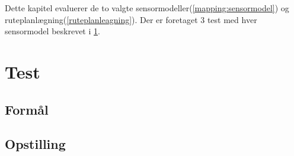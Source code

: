 Dette kapitel evaluerer de to valgte sensormodeller(\cref{mapping:sensormodel}) og ruteplanlægning(\cref{ruteplanleagning}).
Der er foretaget 3 test med hver sensormodel beskrevet i \cref{evaluering:test_beskrivelse}.

\section{Test}\label{evaluering:test_beskrivelse}

\subsection{Formål}
\subsection{Opstilling}